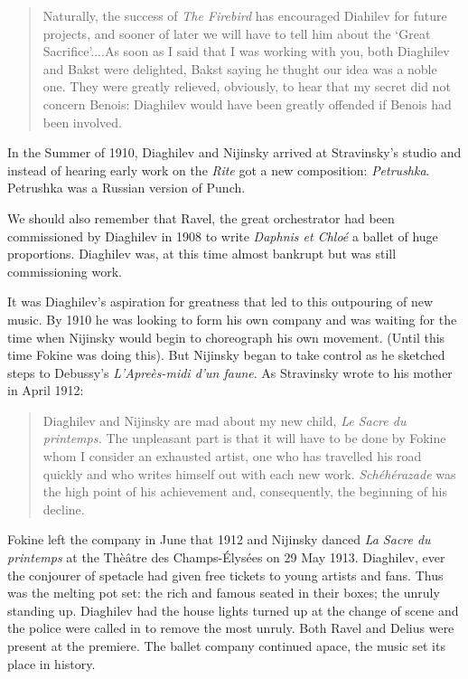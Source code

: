 \begin{quotation}
Naturally, the success of \textit{The Firebird} has encouraged Diahilev for future projects, and sooner of later we will have to tell him about the `Great Sacrifice'....As soon as I said that I was working with you, both Diaghilev and Bakst were delighted, Bakst saying he thught our idea was a noble one. They were greatly relieved, obviously, to hear that my secret did not concern Benois: Diaghilev would have been greatly offended if Benois had been involved.
\end{quotation}

In the Summer of 1910, Diaghilev and Nijinsky arrived at Stravinsky's studio and instead of hearing early work on the \textit{Rite} got a new composition: \textit{Petrushka}. Petrushka was a Russian version of Punch. 

We should also remember that Ravel, the great orchestrator had been commissioned by Diaghilev in 1908 to write \textit{Daphnis et Chlo\'e} a ballet of huge proportions. Diaghilev was, at this time almost bankrupt but was still commissioning work. 

It was Diaghilev's aspiration for greatness that led to this outpouring of new music. By 1910 he was looking to form his own company and was waiting for the time when Nijinsky would begin to choreograph his own movement. (Until this time Fokine was doing this). But Nijinsky began to take control as he sketched steps to Debussy's \textit{L'Apre\`es-midi d'un faune}. As Stravinsky wrote to his mother in April 1912:

\begin{quotation}
Diaghilev and Nijinsky are mad about my new child, \textit{Le Sacre du printemps.} The unpleasant part is that it will have to be done by Fokine whom I consider an exhausted artist, one who has travelled his road quickly and who writes himself out with each new work. \textit{Sch\'eh\'erazade} was the high point of his achievement and, consequently, the beginning of his decline.
\end{quotation}

Fokine left the company in June that 1912 and Nijinsky danced \textit{La Sacre du printemps} at the Th\`e\^atre des Champs-\'Elys\'ees on 29 May 1913. Diaghilev, ever the conjourer of spetacle had given free tickets to young artists and fans. Thus was the melting pot set: the rich and famous seated in their boxes; the unruly standing up. Diaghilev had the house lights turned up at the change of scene and the police were called in to remove the most unruly. Both Ravel and Delius were present at the premiere. The ballet company continued apace, the music set its place in history. 

